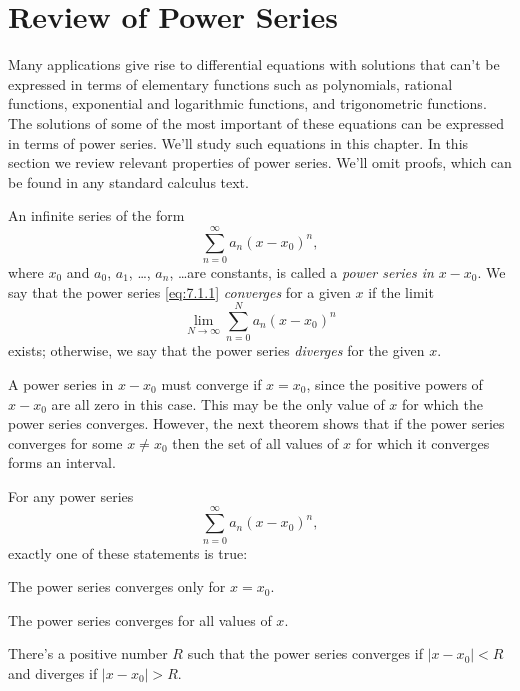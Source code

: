 \section{Review of Power Series}

\noindent
Many applications give rise to differential equations with solutions that can't be expressed in
terms of elementary functions such as polynomials, rational functions, exponential and logarithmic
functions, and trigonometric functions. The solutions of some of the most important of these
equations can be expressed in terms of power series. We'll study such equations in this chapter. In
this section we review relevant properties of power series. We'll omit proofs, which can be found in
any standard calculus text.

\begin{definition}
  \color{blue}
  \label{thmtype:7.1.1} \rm An infinite series of the form
  \begin{equation}
    \label{eq:7.1.1}\sum_{n=0}^{\infty}a_{n}(x-x_{0})^{n},
  \end{equation}
  where $x_{0}$ and $a_{0}$, $a_{1}$, \dots, $a_{n}$, \dots are constants, is called a
  {\color{blue}\it power series in\/} $x-x_{0}$. We say that the power series \eqref{eq:7.1.1}
  {\color{blue}\it converges\/} for a given $x$ if the limit
  \[
    \lim_{N\to\infty}\sum_{n=0}^{N}a_{n}(x-x_{0})^{n}
  \]
  exists; otherwise, we say that the power series {\color{blue}\it diverges\/} for the given $x$.
\end{definition}

A power series in $x-x_{0}$ must converge if $x=x_{0}$, since the positive powers of $x-x_{0}$ are
all zero in this case. This may be the only value of $x$ for which the power series converges.
However, the next theorem shows that if the power series converges for some $x\ne x_{0}$ then the
set of all values of $x$ for which it converges forms an interval.

\begin{theorem}
  \color{blue}
  \label{thmtype:7.1.2} For any power series
  \[
    \sum_{n=0}^{\infty}a_{n}(x-x_{0})^{n},
  \]
  exactly one of these statements is true:
  \begin{rmlist}
    \item %
    The power series converges only for $x=x_{0}$.

    \item %
    The power series converges for all values of $x$.

    \item %
    There's a positive number $R$ such that the power series converges if $|x-x_{0}|<R$ and diverges
    if $|x-x_{0}|>R$.
  \end{rmlist}
\end{theorem}

